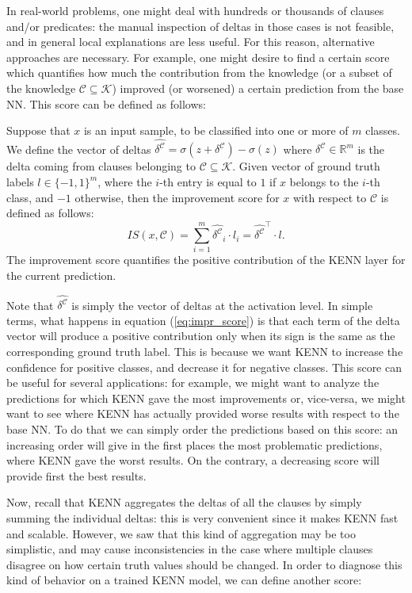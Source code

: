 In real-world problems, one might deal with hundreds or thousands of clauses and/or predicates: the manual inspection of deltas in those cases is not feasible, and in general local explanations are less useful. For this reason, alternative approaches are necessary. For example, one might desire to find a certain score which quantifies how much the contribution from the knowledge (or a subset of the knowledge $\mathcal{C \subseteq \mathcal{K}}$) improved (or worsened) a certain prediction from the base NN.
This score can be defined as follows:
\begin{definition}
	Suppose that $x$ is an input sample, to be classified into one or more of $m$ classes. We define the vector of deltas $\hat{\delta^{\mathcal{C}}} = \sigma(z + \delta^{\mathcal{C}}) - \sigma(z)$ where  $\delta^{\mathcal{C}}\in \mathbb{R}^m$ is the delta coming from clauses belonging to $\mathcal{C} \subseteq \mathcal{K}$. Given vector of ground truth labels $l \in \{-1,1\}^m$, where the $i$-th entry is equal to $1$ if $x$ belongs to the $i$-th class, and $-1$ otherwise, then the improvement score for $x$ with respect to $\mathcal{C}$ is defined as follows:
	\begin{equation}
	\label{eq:impr_score}
	IS(x,\mathcal{C})=\sum_{i=1}^m \hat{\delta^{\mathcal{C}}}_i \cdot  l_i =  \hat{\delta^{\mathcal{C}}}^{\top} \cdot  l.
	\end{equation}
	The improvement score quantifies the positive contribution of the KENN layer for the current prediction.
\end{definition}
Note that $\hat{\delta^{\mathcal{C}}}$ is simply the vector of deltas at the activation level. In simple terms, what happens in equation (\ref{eq:impr_score}) is that each term of the delta vector will produce a positive contribution only when its sign is the same as the corresponding ground truth label. This is because we want KENN to increase the confidence for positive classes, and decrease it for negative classes. This score can be useful for several applications: for example, we might want to analyze the predictions for which KENN gave the most improvements or, vice-versa, we might want to see where KENN has actually provided worse results with respect to the base NN. To do that we can simply order the predictions based on this score: an increasing order will give in the first places the most problematic predictions, where KENN gave the worst results. On the contrary, a decreasing score will provide first the best results.


Now, recall that KENN aggregates the deltas of all the clauses by simply summing the individual deltas: this is very convenient since it makes KENN fast and scalable. However, we saw that this kind of aggregation may be too simplistic, and may cause inconsistencies in the case where multiple clauses disagree on how certain truth values should be changed. In order to diagnose this kind of behavior on a trained KENN model, we can define another score:

